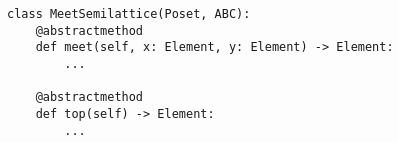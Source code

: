 \par\begin{minipage}{60ex}
\begin{verbatim}
class MeetSemilattice(Poset, ABC):
    @abstractmethod
    def meet(self, x: Element, y: Element) -> Element:
        ...

    @abstractmethod
    def top(self) -> Element:
        ...
\end{verbatim}
\end{minipage}\par